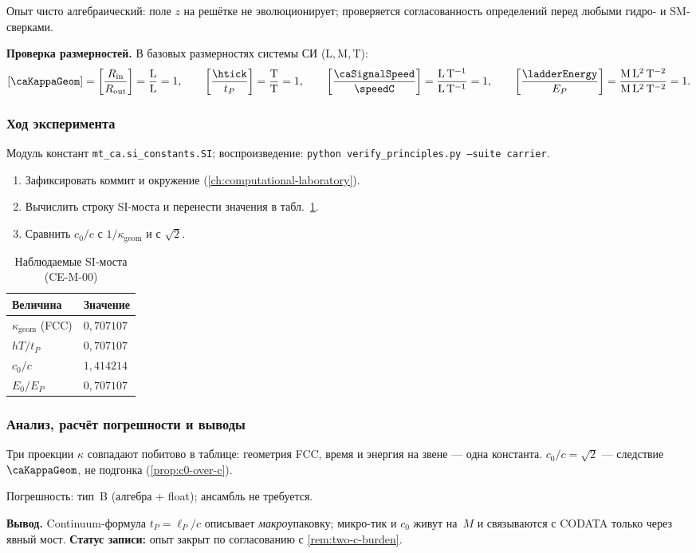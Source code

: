 Опыт чисто алгебраический: поле $z$ на решётке не эволюционирует; проверяется согласованность определений перед любыми гидро- и SM-сверками.

\textbf{Проверка размерностей.}
В базовых размерностях системы СИ ($\mathrm{L, M, T}$):
\[
  [\caKappaGeom] = \left[\frac{R_{\mathrm{in}}}{R_{\mathrm{out}}}\right] = \frac{\mathrm{L}}{\mathrm{L}} = 1,\qquad
  \left[\frac{\htick}{t_P}\right] = \frac{\mathrm{T}}{\mathrm{T}} = 1,\qquad
  \left[\frac{\caSignalSpeed}{\speedC}\right] = \frac{\mathrm{L\,T^{-1}}}{\mathrm{L\,T^{-1}}} = 1,\qquad
  \left[\frac{\ladderEnergy}{E_P}\right] = \frac{\mathrm{M\,L^2\,T^{-2}}}{\mathrm{M\,L^2\,T^{-2}}} = 1.
\]

\subsubsection*{Ход эксперимента}
Модуль констант \texttt{mt\_ca.si\_constants.SI}; воспроизведение:
\texttt{python verify\_principles.py --suite carrier}.

\begin{enumerate}[label=\textbf{Шаг \arabic*:},leftmargin=*,itemsep=0.35em]
\item Зафиксировать коммит и окружение (\cref{ch:computational-laboratory}).
\item Вычислить строку SI-моста и перенести значения в табл.~\ref{tab:exp-ce-m-00}.
\item Сравнить $c_0/c$ с $1/\kappa_{\mathrm{geom}}$ и с $\sqrt{2}$.
\end{enumerate}

\begin{table}[htbp]
\centering
\small
\caption{Наблюдаемые SI-моста (CE-M-00)}
\label{tab:exp-ce-m-00}
\begin{tabular}{@{}ll@{}}
\toprule
Величина & Значение \\
\midrule
$\kappa_{\mathrm{geom}}$ (FCC) & $0{,}707107$ \\
$hT/t_P$ & $0{,}707107$ \\
$c_0/c$ & $1{,}414214$ \\
$E_0/E_P$ & $0{,}707107$ \\
\bottomrule
\end{tabular}
\end{table}

\subsubsection*{Анализ, расчёт погрешности и выводы}
Три проекции $\kappa$ совпадают побитово в таблице: геометрия FCC, время и энергия на звене --- одна константа.
$c_0/c=\sqrt{2}$ --- следствие $\caKappaGeom$, не подгонка (\cref{prop:c0-over-c}).

Погрешность: тип~B (алгебра + float); ансамбль не требуется.

\textbf{Вывод.}
Continuum-формула $t_P=\ell_P/c$ описывает \emph{макро}упаковку; микро-тик и $c_0$ живут на~$M$ и связываются с CODATA только через явный мост.
\textbf{Статус записи:} опыт закрыт по согласованию с \cref{rem:two-c-burden}.
